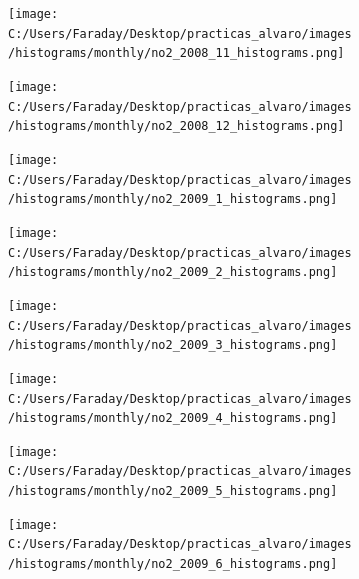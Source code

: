 \documentclass[12pt]{article}
\begin{document}
\begin{figure}[H]
\centering
\begin{subfigure}[h]{0.45\textwidth}
\texttt{[image: C:/Users/Faraday/Desktop/practicas\_alvaro/images/histograms/monthly/no2\_2008\_11\_histograms.png]}
\caption{}
\label{fig:hist-mon-1-11-2008}
\end{subfigure}
%
\begin{subfigure}[H]{0.45\textwidth}
\texttt{[image: C:/Users/Faraday/Desktop/practicas\_alvaro/images/histograms/monthly/no2\_2008\_12\_histograms.png]}
\caption{}
\label{fig:hist-mon-1-12-2008}
\end{subfigure}
\caption{}
\end{figure}

\newpage

\begin{figure}[H]
\centering
\begin{subfigure}[h]{0.45\textwidth}
\texttt{[image: C:/Users/Faraday/Desktop/practicas\_alvaro/images/histograms/monthly/no2\_2009\_1\_histograms.png]}
\caption{}
\label{fig:hist-mon-1-1-2009}
\end{subfigure}
%
\begin{subfigure}[H]{0.45\textwidth}
\texttt{[image: C:/Users/Faraday/Desktop/practicas\_alvaro/images/histograms/monthly/no2\_2009\_2\_histograms.png]}
\caption{}
\label{fig:hist-mon-1-2-2009}
\end{subfigure}
\caption{}
\end{figure}

\begin{figure}[H]
\centering
\begin{subfigure}[h]{0.45\textwidth}
\texttt{[image: C:/Users/Faraday/Desktop/practicas\_alvaro/images/histograms/monthly/no2\_2009\_3\_histograms.png]}
\caption{}
\label{fig:hist-mon-1-3-2009}
\end{subfigure}
%
\begin{subfigure}[H]{0.45\textwidth}
\texttt{[image: C:/Users/Faraday/Desktop/practicas\_alvaro/images/histograms/monthly/no2\_2009\_4\_histograms.png]}
\caption{}
\label{fig:hist-mon-1-4-2009}
\end{subfigure}
\caption{}
\end{figure}

\begin{figure}[H]
\centering
\begin{subfigure}[h]{0.45\textwidth}
\texttt{[image: C:/Users/Faraday/Desktop/practicas\_alvaro/images/histograms/monthly/no2\_2009\_5\_histograms.png]}
\caption{}
\label{fig:hist-mon-1-5-2009}
\end{subfigure}
%
\begin{subfigure}[H]{0.45\textwidth}
\texttt{[image: C:/Users/Faraday/Desktop/practicas\_alvaro/images/histograms/monthly/no2\_2009\_6\_histograms.png]}
\caption{}
\label{fig:hist-mon-1-6-2009}
\end{subfigure}
\caption{}
\end{figure}
\end{document}
